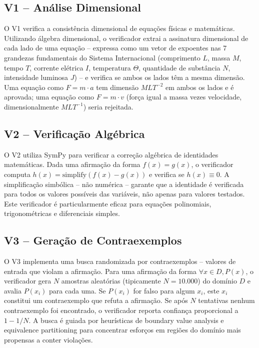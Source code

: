 \documentclass[12pt,a4paper,sumario=tradicional,openany]{abntex2}
\begin{document}
\subsection{V1 -- Análise Dimensional}

O V1 verifica a consistência dimensional de equações físicas e matemáticas. Utilizando álgebra dimensional, o verificador extrai a assinatura dimensional de cada lado de uma equação -- expressa como um vetor de expoentes nas 7 grandezas fundamentais do Sistema Internacional (comprimento $L$, massa $M$, tempo $T$, corrente elétrica $I$, temperatura $\Theta$, quantidade de substância $N$, intensidade luminosa $J$) -- e verifica se ambos os lados têm a mesma dimensão. Uma equação como $F = m \cdot a$ tem dimensão $MLT^{-2}$ em ambos os lados e é aprovada; uma equação como $F = m \cdot v$ (força igual a massa vezes velocidade, dimensionalmente $MLT^{-1}$) seria rejeitada.

\subsection{V2 -- Verificação Algébrica}

O V2 utiliza SymPy para verificar a correção algébrica de identidades matemáticas. Dada uma afirmação da forma $f(x) = g(x)$, o verificador computa $h(x) = \text{simplify}(f(x) - g(x))$ e verifica se $h(x) \equiv 0$. A simplificação simbólica -- não numérica -- garante que a identidade é verificada para todos os valores possíveis das variáveis, não apenas para valores testados. Este verificador é particularmente eficaz para equações polinomiais, trigonométricas e diferenciais simples.

\subsection{V3 -- Geração de Contraexemplos}

O V3 implementa uma busca randomizada por contraexemplos -- valores de entrada que
violam a afirmação. Para uma afirmação da forma $\forall x \in D, P(x)$, o verificador
gera $N$ amostras aleatórias (tipicamente $N = 10.000$) do domínio $D$ e avalia
$P(x_i)$ para cada uma. Se $P(x_i)$ for falso para algum $x_i$, este $x_i$ constitui
um contraexemplo que refuta a afirmação. Se após $N$ tentativas nenhum contraexemplo
foi encontrado, o verificador reporta confiança proporcional a $1 - 1/N$. A busca é
guiada por heurísticas de boundary value analysis e equivalence partitioning para
concentrar esforços em regiões do domínio mais propensas a conter violações.
\end{document}
